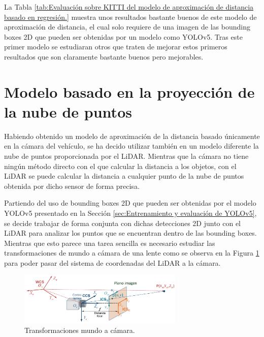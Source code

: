 La Tabla \ref{tab:Evaluación sobre KITTI del modelo de aproximación de distancia basado en regresión.} muestra unos resultados bastante buenos de este modelo de aproximación de distancia, el cual solo requiere de una imagen de las bounding boxes 2D que pueden ser obtenidas por un modelo como YOLOv5. Tras este primer modelo se estudiaran otros que traten de mejorar estos primeros resultados que son claramente bastante buenos pero mejorables.

\section{Modelo basado en la proyección de la nube de puntos}
\label{sec:Modelo basado en la proyección de la nube de puntos}

Habiendo obtenido un modelo de aproximación de la distancia basado únicamente en la cámara del vehículo, se ha decido utilizar también en un modelo diferente la nube de puntos proporcionada por el \ac{LiDAR}. Mientras que la cámara no tiene ningún método directo con el que calcular la distancia a los objetos, con el \ac{LiDAR} se puede calcular la distancia a cualquier punto de la nube de puntos obtenida por dicho sensor de forma precisa.

Partiendo del uso de bounding boxes 2D que pueden ser obtenidas por el modelo YOLOv5 presentado en la Sección \ref{sec:Entrenamiento y evaluación de YOLOv5}, se decide trabajar de forma conjunta con dichas detecciones 2D junto con el \ac{LiDAR} para analizar los puntos que se encuentran dentro de las bounding boxes. Mientras que esto parece una tarea sencilla es necesario estudiar las transformaciones de mundo a cámara de una lente como se observa en la Figura \ref{fig:Transformaciones mundo a cámara.} para poder pasar del sistema de coordenadas del LiDAR a la cámara.

\begin{figure}[H]
    \centering
    \includegraphics[width=0.7\textwidth]{Book/figures/6_approx_distancia/funcionamiento_camara.png}
    \caption{Transformaciones mundo a cámara.}
    \label{fig:Transformaciones mundo a cámara.}
\end{figure}

